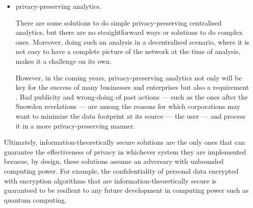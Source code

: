 \begin{itemize}[topsep=\parskip, parsep=\parskip, itemsep=\parskip]
    Although our focus in this work has been on decentralisation of centralised 
    \acp{is}, such as those where there can be various actors --- for example, in 
    \acp{osn}, there are also other scenarios where decentralisation could be of 
    interest
    
    For example, in home care\footnote{Medical care and safety are some controversial 
    matters when it comes to ideal privacy. Consider an unsconcious person in a 
    life threating situation, should her medical history be accessed without her 
    consent? It would be technologically possible to protect such sensitive personal 
    data but it simply does not make sense. However, it is clear it would be a privacy 
    violation allowed in many legislations because the preservation of the human 
    life is an unquestioned obligation.} --- where a nurse carries some sensitive 
    \acl{pii} in order to provide the right care to a patient and eventually returns 
    to the primary care facility with some new personal data about that patient, 
    in content-sharing or even in public ledging of transactions without a \acl{ttp} 
    --- such as those happening in the blockchain powering the crypto-currency \Bitcoin.
    
    \item privacy-preserving analytics.
    
    There are some solutions to do simple privacy-preserving centralised analytics, 
    but there are no straightforward ways or solutions to do complex ones. Moreover, 
    doing such an analysis in a decentralised scenario, where it is not easy to have 
    a complete picture of the network at the time of analysis, makes it a challenge 
    on its own.
    
    However, in the coming years, privacy-preserving analytics not only will be 
    key for the success of many businesses and enterprises but also a requirement 
    \cite{LuZLLS14}. Bad publicity and wrong-doing of past actions --- such as the 
    ones after the Snowden revelations --- are among the reasons for which corporations 
    may want to minimize the data footprint at its source --- the user --- and 
    process it in a more privacy-preserving manner. 
    
\end{itemize}

Ultimately, information-theoretically secure solutions are the only ones that can 
guarantee the effectiveness of privacy in whichever system they are implemented becasue, 
by design, these solutions assume an adversary with unbounded computing power. 
For example, the confidentiality of personal data encrypted with encryption algorithms 
that are information-theoretically secure is guaranteed to be resilient to any future 
development in computing power such as quantum computing. 

